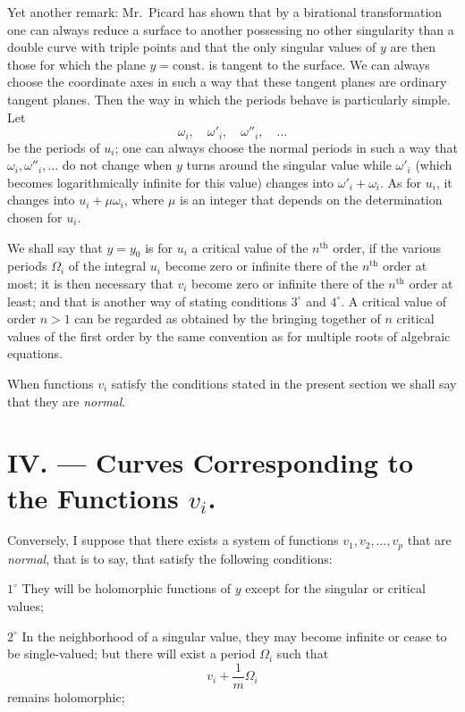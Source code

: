 \documentclass{article}
\begin{document}
Yet another remark: Mr.~Picard has shown that by a birational transformation one can always reduce a surface to another possessing no other singularity than a double curve with triple points and that the only singular values of $y$ are then those for which the plane $y = \text{const.}$ is tangent to the surface. We can always choose the coordinate axes in such a way that these tangent planes are ordinary tangent planes. Then the way in which the periods behave is particularly simple. Let
\[
\omega_{i}, \quad \omega'_{i}, \quad \omega''_{i}, \quad \ldots
\]
be the periods of $u_{i}$; one can always choose the normal periods in such a way that $\omega_{i}, \omega''_{i}, \ldots$ do not change when $y$ turns around the singular value while $\omega'_{i}$ (which becomes logarithmically infinite for this value) changes into $\omega'_{i} + \omega_{i}$. As for $u_{i}$, it changes into $u_{i} + \mu \omega_{i}$, where $\mu$ is an integer that depends on the determination chosen for $u_{i}$.

We shall say that $y = y_{0}$ is for $u_{i}$ a critical value of the $n^{\text{th}}$ order, if the various periods $\Omega_{i}$ of the integral $u_{i}$ become zero or infinite there of the $n^{\text{th}}$ order at most; it is then necessary that $v_{i}$ become zero
or infinite there of the $n^{\text{th}}$ order at least; and that is another way of stating conditions $3^\circ$ and $4^\circ$. A critical value of order $n > 1$ can be regarded as obtained by the bringing together of $n$ critical values of the first order by the same convention as for multiple roots of algebraic equations.

When functions $v_{i}$ satisfy the conditions stated in the present section we shall say that they are \emph{normal}.

\section*{IV. --- Curves Corresponding to the Functions $v_{i}$.}

Conversely, I suppose that there exists a system of functions $v_{1}, v_{2}, \ldots, v_{p}$ that are \emph{normal}, that is to say, that satisfy the following conditions:

$1^\circ$ They will be holomorphic functions of $y$ except for the singular or critical values;

$2^\circ$ In the neighborhood of a singular value, they may become infinite or cease to be single-valued; but there will exist a period $\Omega_{i}$ such that
\[
v_{i} + \frac{1}{m} \Omega_{i}
\]
remains holomorphic;
\end{document}
